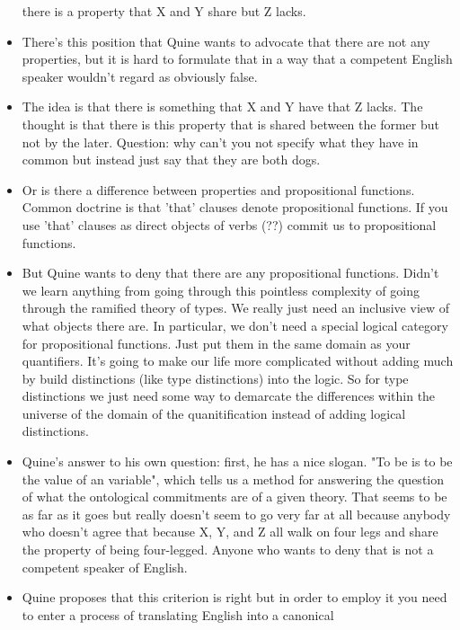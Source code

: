\documentclass[12pt]{article}
\theoremstyle{definition}
\begin{document}
\begin{itemize}
        there is a property that X and Y share but Z lacks.
    \item
        There's this position that Quine wants to advocate that there are not
        any properties, but it is hard to formulate that in a way that a
        competent English speaker wouldn't regard as obviously false.
    \item
        The idea is that there is something that X and Y have that Z lacks. The
        thought is that there is this property that is shared between the
        former but not by the later. Question: why can't you not specify what
        they have in common but instead just say that they are both dogs.
    \item
        Or is there a difference between properties and propositional
        functions. Common doctrine is that 'that' clauses denote propositional
        functions. If you use 'that' clauses as direct objects of verbs (??)
        commit us to propositional functions.
    \item
        But Quine wants to deny that there are any propositional functions.
        Didn't we learn anything from going through this pointless complexity
        of going through the ramified theory of types. We really just need an
        inclusive view of what objects there are. In particular, we don't need
        a special logical category for propositional functions. Just put them
        in the same domain as your quantifiers. It's going to make our life
        more complicated without adding much by build distinctions (like type
        distinctions) into the logic. So for type distinctions we just need
        some way to demarcate the differences within the universe of the domain
        of the quanitification instead of adding logical distinctions. 
    \item
        Quine's answer to his own question: first, he has a nice slogan. "To be
        is to be the value of an variable", which tells us a method for
        answering the question of what the ontological commitments are of a
        given theory. That seems to be as far as it goes but really doesn't
        seem to go very far at all because anybody who doesn't agree that
        because X, Y, and Z all walk on four legs and share the property of
        being four-legged. Anyone who wants to deny that is not a competent
        speaker of English. 
    \item
        Quine proposes that this criterion is right but in order to employ it
        you need to enter a process of translating English into a canonical

\end{itemize}
\end{document}

